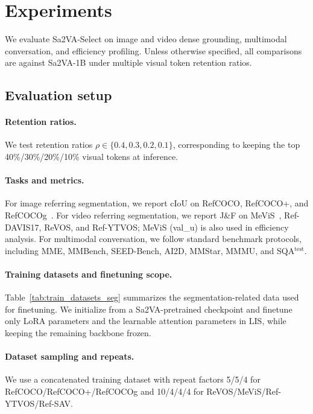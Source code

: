 \section{Experiments}
\label{sec:exp}

We evaluate Sa2VA-Select on image and video dense grounding, multimodal conversation, and efficiency profiling.
Unless otherwise specified, all comparisons are against Sa2VA-1B under multiple visual token retention ratios.

\subsection{Evaluation setup}
\paragraph{Retention ratios.}
We test retention ratios $\rho\in\{0.4,0.3,0.2,0.1\}$, corresponding to keeping the top 40\%/30\%/20\%/10\% visual tokens at inference.

\paragraph{Tasks and metrics.}
For image referring segmentation, we report cIoU on RefCOCO, RefCOCO+, and RefCOCOg~\cite{yu2016modeling}.
For video referring segmentation, we report J\&F on MeViS~\cite{ding2023mevis}, Ref-DAVIS17, ReVOS, and Ref-YTVOS; MeViS (val\_u) is also used in efficiency analysis.
For multimodal conversation, we follow standard benchmark protocols, including MME, MMBench, SEED-Bench, AI2D, MMStar, MMMU, and SQA$^{\mathrm{test}}$.

\paragraph{Training datasets and finetuning scope.}
Table~\ref{tab:train_datasets_seg} summarizes the segmentation-related data used for finetuning.
We initialize from a Sa2VA-pretrained checkpoint and finetune only LoRA parameters and the learnable attention parameters in LIS, while keeping the remaining backbone frozen.

\paragraph{Dataset sampling and repeats.}
We use a concatenated training dataset with repeat factors 5/5/4 for RefCOCO/RefCOCO+/RefCOCOg and 10/4/4/4 for ReVOS/MeViS/Ref-YTVOS/Ref-SAV.

